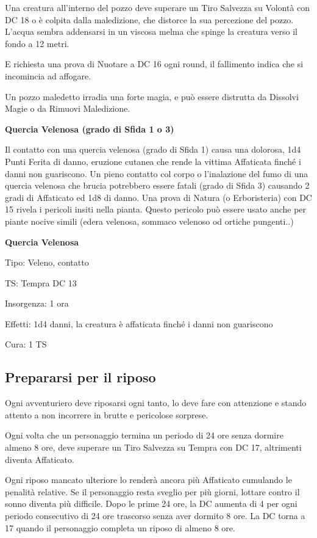 \begin{multicols}{2}
Una creatura all'interno del pozzo deve superare un Tiro Salvezza su Volontà con DC 18 o è colpita dalla maledizione, che distorce la sua percezione del pozzo. L'acqua sembra addensarsi in un viscosa melma che spinge la creatura verso il fondo a 12 metri.

E richiesta una prova di Nuotare a DC 16 ogni round, il fallimento indica che si incomincia ad affogare.

Un pozzo maledetto irradia una forte magia, e può essere distrutta da Dissolvi Magie o da Rimuovi Maledizione.

\medskip
\textbf{Quercia Velenosa (grado di Sfida 1 o 3)}

Il contatto con una quercia velenosa (grado di Sfida 1) causa una dolorosa, 1d4 Punti Ferita di danno, eruzione cutanea che rende la vittima Affaticata finché i danni non guariscono. Un pieno contatto col corpo o l'inalazione del fumo di una quercia velenosa che brucia potrebbero essere fatali (grado di Sfida 3) causando 2 gradi di Affaticato ed 1d8 di danno.
Una prova di Natura (o Erboristeria) con DC 15 rivela i pericoli insiti nella pianta. Questo pericolo può essere usato anche per piante nocive simili (edera velenosa, sommaco velenoso od ortiche pungenti..)

\textbf{Quercia Velenosa}

Tipo: Veleno, contatto

TS: Tempra DC 13

Insorgenza: 1 ora

Effetti: 1d4 danni, la creatura è affaticata finché i danni non guariscono

Cura: 1 TS


\subsection{Prepararsi per il riposo}

Ogni avventuriero deve riposarsi ogni tanto, lo deve fare con attenzione e stando attento a non incorrere in brutte e pericolose sorprese.

Ogni volta che un personaggio termina un periodo di 24 ore senza dormire almeno 8 ore, deve superare un Tiro Salvezza su Tempra con DC 17, altrimenti diventa Affaticato.

Ogni riposo mancato ulteriore lo renderà ancora più Affaticato cumulando le penalità relative. Se il personaggio resta sveglio per più giorni, lottare contro il sonno diventa più difficile. Dopo le prime 24 ore, la DC aumenta di 4 per ogni periodo consecutivo di 24 ore trascorso senza aver dormito 8 ore. La DC torna a 17 quando il personaggio completa un riposo di almeno 8 ore.


\end{multicols}
